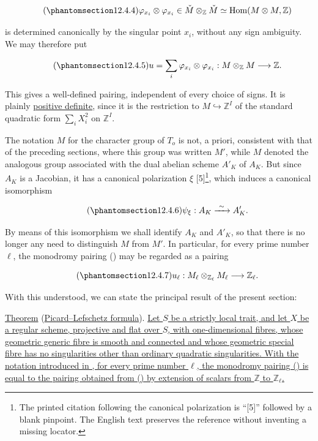 \begin{equation}\tag{\SGARefTarget{sga7.sga7i.eix.n12-4-4}{12.4.4}}
 \varphi_{x_i}\otimes\varphi_{x_i}
 \in \check M\otimes_{\mathbb Z}\check M
 \simeq\operatorname{Hom}(M\otimes M,\mathbb Z)
\end{equation}

\noindent
is determined canonically by the singular point $x_i$, without any sign
ambiguity. We may therefore put

\begin{equation}\tag{\SGARefTarget{sga7.sga7i.eix.n12-4-5}{12.4.5}}
 u=\sum_i\varphi_{x_i}\otimes\varphi_{x_i}:
 M\otimes_{\mathbb Z}M\longrightarrow\mathbb Z.
\end{equation}

This gives a well-defined pairing, independent of every choice of
signs. It is plainly \underline{positive definite}, since it is the
restriction to $M\hookrightarrow\mathbb Z^I$ of the standard quadratic
form $\sum_i X_i^2$ on $\mathbb Z^I$.

The notation $M$ for the character group of $T_o$ is not, a priori,
consistent with that of the preceding sections, where this group was
written $M'$, while $M$ denoted the analogous group associated with the
dual abelian scheme $A'_K$ of $A_K$. But since $A_K$ is a Jacobian, it
has a canonical polarization $\xi$ [5]\footnote{The printed citation
following the canonical polarization is ``[5]'' followed by a blank
pinpoint. The English text preserves the reference without inventing a
missing locator.}, which induces a canonical
isomorphism

\begin{equation}\tag{\SGARefTarget{sga7.sga7i.eix.n12-4-6}{12.4.6}}
 \psi_\xi:A_K\xrightarrow{\ \sim\ }A'_K.
\end{equation}

\noindent
By means of this isomorphism we shall identify $A_K$ and $A'_K$, so that
there is no longer any need to distinguish $M$ from $M'$. In particular,
for every prime number $\ell$, the monodromy pairing () may be
regarded as a pairing

\begin{equation}\tag{\SGARefTarget{sga7.sga7i.eix.n12-4-7}{12.4.7}}
 u_\ell:M_\ell\otimes_{\mathbb Z_\ell}M_\ell
 \longrightarrow\mathbb Z_\ell.
\end{equation}

With this understood, we can state the principal result of the present
section:

\medskip
\noindent
\underline{Theorem}  (\underline{Picard--Lefschetz formula}).
\underline{Let $S$ be a strictly local trait, and let $X$ be a regular
scheme, projective and flat over $S$, with one-dimensional fibres, whose
geometric generic fibre is smooth and connected and whose geometric
special fibre has no singularities other than ordinary quadratic
singularities. With the notation introduced in , for every prime
number $\ell$, the monodromy pairing () is equal to the pairing
obtained from () by extension of scalars from $\mathbb Z$ to
$\mathbb Z_\ell$.}
